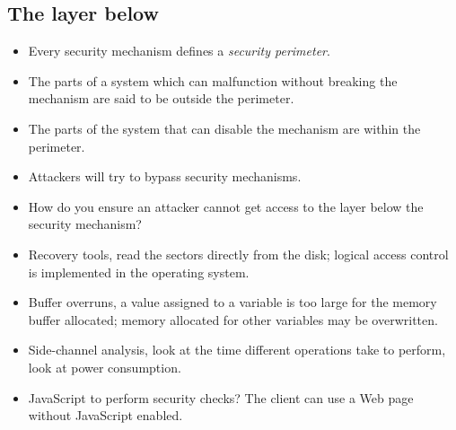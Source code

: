 \subsection{The layer below}

\begin{frame}
  \begin{itemize}
    \item Every security mechanism defines a \emph{security perimeter}.

    \item The parts of a system which can malfunction without breaking the 
      mechanism are said to be outside the perimeter.

    \item The parts of the system that can disable the mechanism are within the 
      perimeter.
  \end{itemize}
\end{frame}

\begin{frame}
  \begin{itemize}
    \item Attackers will try to bypass security mechanisms.

    \item How do you ensure an attacker cannot get access to the layer below 
      the security mechanism?
  \end{itemize}
\end{frame}

\begin{frame}
  \begin{itemize}
    \item Recovery tools, read the sectors directly from the disk; logical 
      access control is implemented in the operating system.

    \item Buffer overruns, a value assigned to a variable is too large for the 
      memory buffer allocated; memory allocated for other variables may be 
      overwritten.

    \item Side-channel analysis, look at the time different operations take to 
      perform, look at power consumption.

    \item JavaScript to perform security checks?
      The client can use a Web page without JavaScript enabled.

  \end{itemize}
\end{frame}



\begin{frame}[allowframebreaks]
  \small
  \printbibliography
\end{frame}

